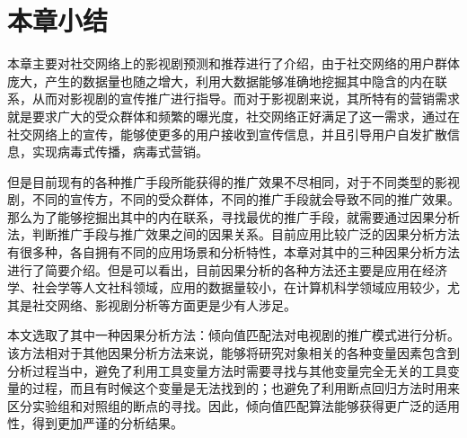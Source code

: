 \section{本章小结}

本章主要对社交网络上的影视剧预测和推荐进行了介绍，由于社交网络的用户群体庞大，产生的数据量也随之增大，利用大数据能够准确地挖掘其中隐含的内在联系，从而对影视剧的宣传推广进行指导。而对于影视剧来说，其所特有的营销需求就是要求广大的受众群体和频繁的曝光度，社交网络正好满足了这一需求，通过在社交网络上的宣传，能够使更多的用户接收到宣传信息，并且引导用户自发扩散信息，实现病毒式传播，病毒式营销。

但是目前现有的各种推广手段所能获得的推广效果不尽相同，对于不同类型的影视剧，不同的宣传方，不同的受众群体，不同的推广手段就会导致不同的推广效果。那么为了能够挖掘出其中的内在联系，寻找最优的推广手段，就需要通过因果分析法，判断推广手段与推广效果之间的因果关系。目前应用比较广泛的因果分析方法有很多种，各自拥有不同的应用场景和分析特性，本章对其中的三种因果分析方法进行了简要介绍。但是可以看出，目前因果分析的各种方法还主要是应用在经济学、社会学等人文社科领域，应用的数据量较小，在计算机科学领域应用较少，尤其是社交网络、影视剧分析等方面更是少有人涉足。

本文选取了其中一种因果分析方法：倾向值匹配法对电视剧的推广模式进行分析。该方法相对于其他因果分析方法来说，能够将研究对象相关的各种变量因素包含到分析过程当中，避免了利用工具变量方法时需要寻找与其他变量完全无关的工具变量的过程，而且有时候这个变量是无法找到的；也避免了利用断点回归方法时用来区分实验组和对照组的断点的寻找。因此，倾向值匹配算法能够获得更广泛的适用性，得到更加严谨的分析结果。




























































